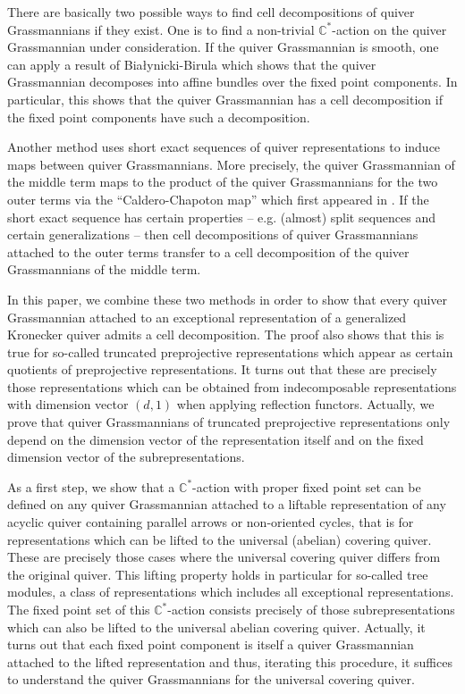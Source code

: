 \documentclass{amsart}
\numberwithin{equation}{section}
\newcommand{\CC}{\mathbb{C}}
\begin{document}
There are basically two possible ways to find cell decompositions of quiver Grassmannians if they exist.
One is to find a non-trivial $\CC^*$-action on the quiver Grassmannian under consideration.
If the quiver Grassmannian is smooth, one can apply a result of Bia\l{}ynicki-Birula \cite{bb} which shows that the quiver Grassmannian decomposes into affine bundles over the fixed point components.
In particular, this shows that the quiver Grassmannian has a cell decomposition if the fixed point components have such a decomposition.

Another method uses short exact sequences of quiver representations to induce maps between quiver Grassmannians.
More precisely, the quiver Grassmannian of the middle term maps to the product of the quiver Grassmannians for the two outer terms via the ``Caldero-Chapoton map'' which first appeared in \cite{cc}. 
If the short exact sequence has certain properties -- e.g. (almost) split sequences and certain generalizations -- then cell decompositions of quiver Grassmannians attached to the outer terms transfer to a cell decomposition of the quiver Grassmannians of the middle term.

In this paper, we combine these two methods in order to show that every quiver Grassmannian attached to an exceptional representation of a generalized Kronecker quiver admits a cell decomposition.
The proof also shows that this is true for so-called truncated preprojective representations which appear as certain quotients of preprojective representations.
It turns out that these are precisely those representations which can be obtained from indecomposable representations with dimension vector $(d,1)$ when applying reflection functors.
Actually, we prove that quiver Grassmannians of truncated preprojective representations only depend on the dimension vector of the representation itself and on the fixed dimension vector of the subrepresentations.

As a first step, we show that a $\CC^*$-action with proper fixed point set can be defined on any quiver Grassmannian attached to a liftable representation of any acyclic quiver containing parallel arrows or non-oriented cycles, that is for representations which can be lifted to the universal (abelian) covering quiver.
These are precisely those cases where the universal covering quiver differs from the original quiver.
This lifting property holds in particular for so-called tree modules, a class of representations which includes all exceptional representations.
The fixed point set of this $\CC^*$-action consists precisely of those subrepresentations which can also be lifted to the universal abelian covering quiver.
Actually, it turns out that each fixed point component is itself a quiver Grassmannian attached to the lifted representation and thus, iterating this procedure, it suffices to understand the quiver Grassmannians for the universal covering quiver.
\end{document}
